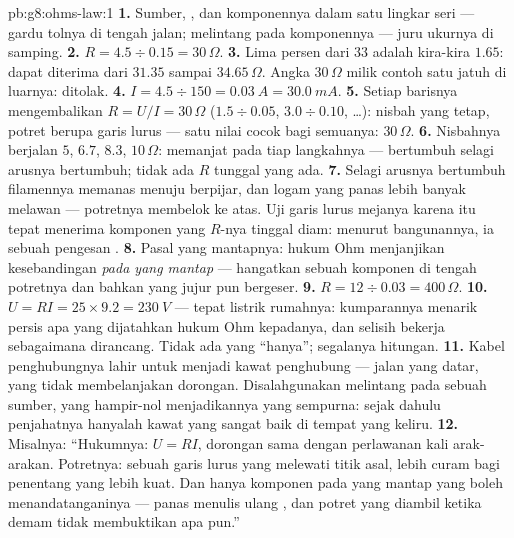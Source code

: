 \begin{solution}{pb:g8:ohms-law:1}
\textbf{1.} Sumber, , dan komponennya dalam satu lingkar
seri --- gardu tolnya di tengah jalan;  melintang pada
komponennya --- juru ukurnya di samping.
\textbf{2.} $R = 4.5 \div 0.15 = 30\,\Omega$.
\textbf{3.} Lima persen dari $33$ adalah kira-kira $1.65$: dapat
diterima dari $31.35$ sampai $34.65\,\Omega$. Angka $30\,\Omega$
milik contoh satu jatuh di luarnya: ditolak.
\textbf{4.} $I = 4.5 \div 150 = \qty{0.03}{A} =
\qty{30.0}{mA}$.
\textbf{5.} Setiap barisnya mengembalikan $R = U/I = 30\,\Omega$ ($1.5
\div 0.05$, $3.0 \div 0.10$, \dots): nisbah yang tetap, potret berupa
garis lurus --- satu nilai cocok bagi semuanya: $30\,\Omega$.
\textbf{6.} Nisbahnya berjalan $5$, $6.7$, $8.3$, $10\,\Omega$:
memanjat pada tiap langkahnya ---  bertumbuh selagi arusnya
bertumbuh; tidak ada $R$ tunggal yang ada.
\textbf{7.} Selagi arusnya bertumbuh filamennya memanas menuju
berpijar, dan logam yang panas lebih banyak melawan --- potretnya
membelok ke atas. Uji garis lurus mejanya karena itu tepat menerima
komponen yang $R$-nya tinggal diam: menurut bangunannya, ia sebuah
pengesan .
\textbf{8.} Pasal  yang mantapnya: hukum Ohm menjanjikan
kesebandingan \emph{pada  yang mantap} --- hangatkan sebuah
komponen di tengah potretnya dan bahkan  yang jujur pun
bergeser.
\textbf{9.} $R = 12 \div 0.03 = 400\,\Omega$.
\textbf{10.} $U = R I = 25 \times 9.2 = \qty{230}{V}$ ---
tepat listrik rumahnya: kumparannya menarik persis apa yang
dijatahkan hukum Ohm kepadanya, dan selisih  bekerja
sebagaimana dirancang. Tidak ada yang ``hanya''; segalanya hitungan.
\textbf{11.} Kabel penghubungnya lahir untuk menjadi kawat penghubung
--- jalan yang datar, yang tidak membelanjakan dorongan.
Disalahgunakan melintang pada sebuah sumber,  yang hampir-nol
menjadikannya  yang sempurna: sejak dahulu penjahatnya
hanyalah kawat yang sangat baik di tempat yang keliru.
\textbf{12.} Misalnya: ``Hukumnya: $U = R I$, dorongan sama dengan
perlawanan kali arak-arakan. Potretnya: sebuah garis lurus yang
melewati titik asal, lebih curam bagi penentang yang lebih kuat. Dan
hanya komponen pada  yang mantap yang boleh menandatanganinya ---
panas menulis ulang , dan potret yang diambil ketika demam
tidak membuktikan apa pun.''
\end{solution}
